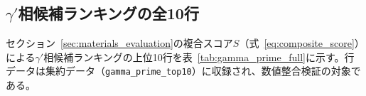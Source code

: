 \documentclass[twocolumn]{interact}
\makeatletter
\def\toprule{\noalign{\ifnum0=`}\fi
  \@aboverulesep=\abovetopsep
  \global\@belowrulesep=\belowrulesep
  \global\@thisruleclass=\@ne
  \@ifnextchar[{\@BTrule}{\@BTrule[\heavyrulewidth]}}
\def\midrule{\noalign{\ifnum0=`}\fi
  \@aboverulesep=\aboverulesep
  \global\@belowrulesep=\belowrulesep
  \global\@thisruleclass=\@ne
  \@ifnextchar[{\@BTrule}{\@BTrule[\lightrulewidth]}}
\def\bottomrule{\noalign{\ifnum0=`}\fi
  \@aboverulesep=\aboverulesep
  \global\@belowrulesep=\belowbottomsep
  \global\@thisruleclass=\@ne
  \@ifnextchar[{\@BTrule}{\@BTrule[\heavyrulewidth]}}
\makeatother
\begin{document}
\begin{table}[htbp]
\centering
\begin{minipage}[t]{0.55\textwidth}
\centering
\caption{上位3つのコンポーネントに対する難易度レベルの$\Delta$（pp）。値は集約データの未丸め値から算出しており、表~\ref{tab:ablation}の表示値同士の差とは末尾桁が一致しない場合がある。層別値（特にVHは$n=20$）は探索的分析である。}
\label{tab:ablation-detail}
\footnotesize
{}
\end{minipage}\hfill
\begin{minipage}[t]{0.40\textwidth}
\centering
\caption{各アブレーション条件におけるクエリごとの平均レイテンシ（秒）、Table~\ref{tab:ablation}と同じ5回の実験で測定。$n$-best = 1に設定すると、精度の明確な損失なしにレイテンシが約70\%削減される。条件間の小差はLLM応答時間のラン間変動を含む。}
\label{tab:latency}
\footnotesize
{}
\end{minipage}
\end{table}


\subsection{$\gamma'$相候補ランキングの全10行}
\label{sec:sup_gamma_prime}

セクション~\ref{sec:materials_evaluation}の複合スコア$S$（式~\ref{eq:composite_score}）による$\gamma'$相候補ランキングの上位10行を表~\ref{tab:gamma_prime_full}に示す。行データは集約データ（\texttt{gamma\_prime\_top10}）に収録され、数値整合検証の対象である。
\end{document}
